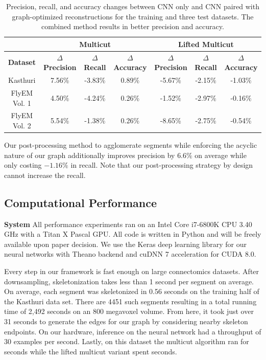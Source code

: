 \begin{table}[h]
	\centering
	\small
	\setlength{\tabcolsep}{0.3em}
	\begin{tabular}{c c c c | c c c} \hline
		& \multicolumn{3}{c}{\textbf{Multicut}} & \multicolumn{3}{c}{\textbf{Lifted Multicut}} \\ \hline
		\textbf{Dataset} & $\Delta$ \textbf{Precision} & $\Delta$ \textbf{Recall} & $\Delta$ \textbf{Accuracy} & $\Delta$ \textbf{Precision} & $\Delta$ \textbf{Recall} & $\Delta$ \textbf{Accuracy} \\ \hline
		Kasthuri  & 7.56\% & -3.83\% & 0.89\% & -5.67\% & -2.15\% & -1.03\% \\
		FlyEM Vol. 1 & 4.50\% & -4.24\% & 0.26\% & -1.52\% & -2.97\% & -0.16\%  \\
		FlyEM Vol. 2 & 5.54\% & -1.38\% & 0.26\% & -8.65\% & -2.75\% & -0.54\%\\ \hline
	\end{tabular}
	\caption{Precision, recall, and accuracy changes between CNN only and CNN paired with graph-optimized reconstructions for the training and three test datasets. The combined method results in better precision and accuracy.}
	\label{table:multicut}
\end{table}

Our post-processing method to agglomerate segments while enforcing the acyclic nature of our graph additionally improves precision by $6.6\%$ on average while only costing $-1.16\%$ in recall. 
Note that our post-processing strategy by design cannot increase the recall. 

\subsection{Computational Performance}
\noindent\textbf{System}
All performance experiments ran on an Intel Core i7-6800K CPU 3.40 GHz with a Titan X Pascal GPU. All code is written in Python and will be freely available upon paper decision. We use the Keras deep learning library for our neural networks with Theano backend and cuDNN 7 acceleration for CUDA 8.0.

Every step in our framework is fast enough on large connectomics datasets. 
After downsampling, skeletonization takes less than 1 second per segment on average. 
On average, each segment was skeletonized in 0.56 seconds on the training half of the Kasthuri data set. 
There are 4451 such segments resulting in a total running time of 2,492 seconds on an 800 megavoxel volume. 
From here, it took just over 31 seconds to generate the edges for our graph by considering nearby skeleton endpoints.
On our hardware, inference on the neural network had a throughput of 30 examples per second. 
Lastly, on this dataset the multicut algorithm ran for  seconds while the lifted multicut variant spent  seconds.
